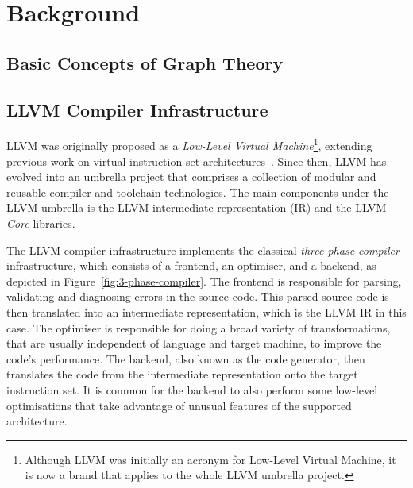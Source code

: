 \chapter{Background}

\section{Basic Concepts of Graph Theory}

\section{LLVM Compiler Infrastructure}

LLVM was originally proposed as a \textit{Low-Level Virtual Machine}\footnote{Although LLVM was initially an acronym for Low-Level Virtual Machine, it is now a brand that applies to the whole LLVM umbrella project.}, extending previous work on virtual instruction set architectures~\citep{adve03,lattner04}.
Since then, LLVM has evolved into an umbrella project that comprises a collection of modular and reusable compiler and toolchain technologies.
The main components under the LLVM umbrella is the LLVM intermediate representation (IR) and the LLVM \textit{Core} libraries.

The LLVM compiler infrastructure implements the classical \textit{three-phase compiler} infrastructure, which consists of a frontend, an optimiser, and a backend, as depicted in Figure~\ref{fig:3-phase-compiler}.
The frontend is responsible for parsing, validating and diagnosing errors in the source code.
This parsed source code is then translated into an intermediate representation, which is the LLVM IR in this case.
The optimiser is responsible for doing a broad variety of transformations, that are usually independent of language and target machine, to improve the code's performance.
The backend, also known as the code generator, then translates the code from the intermediate representation onto the target instruction set.
It is common for the backend to also perform some low-level optimisations that take advantage of unusual features of the supported architecture.

